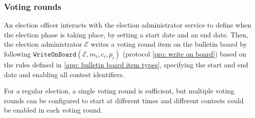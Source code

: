 \subsubsection{Voting rounds} \label{sec: voting rounds}
An election officer interacts with the election administrator service to define when the election phase is taking place, by setting a start date and an end date. Then, the election administrator $\mathcal{E}$ writes a voting round item on the bulletin board by following $\mathtt{WriteOnBoard}(\mathcal{E}, m_i, c_i, p_i)$ (protocol \ref{pro: write on board}) based on the rules defined in \cref{app: bulletin board item types}, specifying the start and end date and enabling all contest identifiers.

For a regular election, a single voting round is sufficient, but multiple voting rounds can be configured to start at different times and different contests could be enabled in each voting round.
